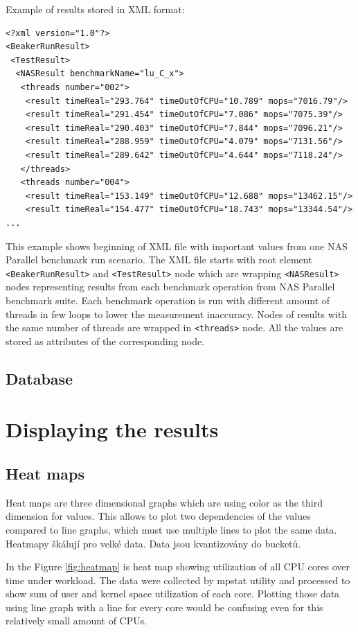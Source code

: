 Example of results stored in XML format:
\begin{verbatim}
<?xml version="1.0"?>
<BeakerRunResult>
 <TestResult>
  <NASResult benchmarkName="lu_C_x">
   <threads number="002">
    <result timeReal="293.764" timeOutOfCPU="10.789" mops="7016.79"/>
    <result timeReal="291.454" timeOutOfCPU="7.086" mops="7075.39"/>
    <result timeReal="290.403" timeOutOfCPU="7.844" mops="7096.21"/>
    <result timeReal="288.959" timeOutOfCPU="4.079" mops="7131.56"/>
    <result timeReal="289.642" timeOutOfCPU="4.644" mops="7118.24"/>
   </threads>
   <threads number="004">
    <result timeReal="153.149" timeOutOfCPU="12.688" mops="13462.15"/>
    <result timeReal="154.477" timeOutOfCPU="18.743" mops="13344.54"/>
...
\end{verbatim}
This example shows beginning of XML file with important values from one NAS
Parallel benchmark run scenario. The XML file starts with root element
\texttt{<BeakerRunResult>} and \texttt{<TestResult>} node which are wrapping
\texttt{<NASResult>} nodes representing results from each benchmark operation
from NAS Parallel benchmark suite. Each benchmark operation is run with
different amount of threads in few loops to lower the measurement inaccuracy.
Nodes of results with the same number of threads are wrapped in
\texttt{<threads>} node. All the values are stored as attributes of the
corresponding node.

\section{Database}


\chapter{Displaying the results}
\section{Heat maps}
Heat maps are three dimensional graphs which are using color as the third
dimension for values. This allows to plot two dependencies of the values
compared to line graphs, which must use multiple lines to plot the same data.
Heatmapy škálují pro velké data. 
Data jsou kvantizovány do bucketů.

In the Figure \ref{fig:heatmap} is heat map showing utilization of all CPU cores over
time under workload. The data were collected by mpstat utility and processed to
show sum of user and kernel space utilization of each core. Plotting those data
using line graph with a line for every core would be confusing even for this
relatively small amount of CPUs.

